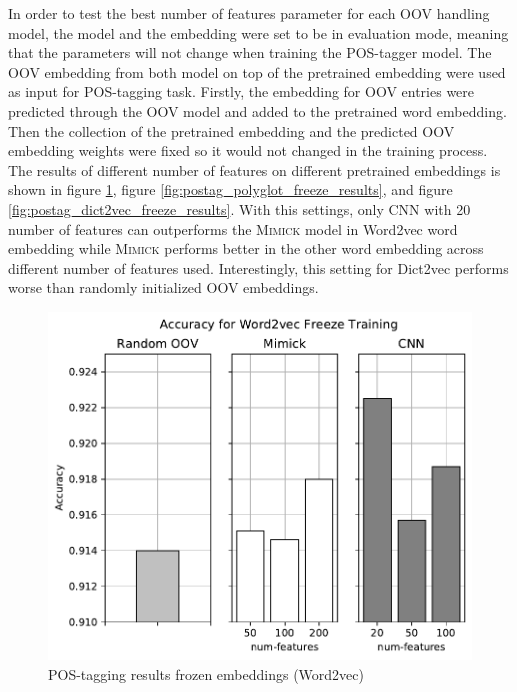       In order to test the best number of features parameter for each
      OOV handling model, the model and the embedding were set to be
      in evaluation mode, meaning that the parameters will not change
      when training the POS-tagger model. The OOV embedding from both
      model on top of the pretrained embedding were used as input for
      POS-tagging task. Firstly, the embedding for OOV entries were
      predicted through the OOV model and added to the pretrained word
      embedding. Then the collection of the pretrained embedding and
      the predicted OOV embedding weights were fixed so it would not
      changed in the training process. The results of different number
      of features on different pretrained embeddings is shown in
      figure \ref{fig:postag_word2vec_freeze_results}, figure
      \ref{fig:postag_polyglot_freeze_results}, and figure
      \ref{fig:postag_dict2vec_freeze_results}. With this settings,
      only CNN with 20 number of features can outperforms the
      \textsc{Mimick} model in Word2vec word embedding while
      \textsc{Mimick} performs better in the other word embedding
      across different number of features used. Interestingly, this
      setting for Dict2vec performs worse than randomly initialized OOV
      embeddings.
      \begin{figure}[H]
        \centering
        \includegraphics[width=0.8\linewidth]{images/freeze_word2vec.pdf}
        \caption{POS-tagging results frozen embeddings (Word2vec)}
        \label{fig:postag_word2vec_freeze_results}
      \end{figure}
